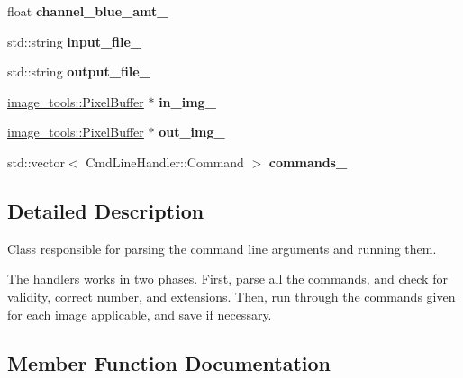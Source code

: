 \begin{DoxyCompactItemize}
\item 
float {\bfseries channel\+\_\+blue\+\_\+amt\+\_\+}\hypertarget{classCmdLineHandler_a722a00d746264abc7ed27ddbb9ba57ba}{}\label{classCmdLineHandler_a722a00d746264abc7ed27ddbb9ba57ba}

\item 
std\+::string {\bfseries input\+\_\+file\+\_\+}\hypertarget{classCmdLineHandler_a58722f1cd629f4f819594947b2d34009}{}\label{classCmdLineHandler_a58722f1cd629f4f819594947b2d34009}

\item 
std\+::string {\bfseries output\+\_\+file\+\_\+}\hypertarget{classCmdLineHandler_a0c8acf675fb60aaff100165f5ac3bacd}{}\label{classCmdLineHandler_a0c8acf675fb60aaff100165f5ac3bacd}

\item 
\hyperlink{classimage__tools_1_1PixelBuffer}{image\+\_\+tools\+::\+Pixel\+Buffer} $\ast$ {\bfseries in\+\_\+img\+\_\+}\hypertarget{classCmdLineHandler_a019ce0d524967719a10c201dc4c3dbb7}{}\label{classCmdLineHandler_a019ce0d524967719a10c201dc4c3dbb7}

\item 
\hyperlink{classimage__tools_1_1PixelBuffer}{image\+\_\+tools\+::\+Pixel\+Buffer} $\ast$ {\bfseries out\+\_\+img\+\_\+}\hypertarget{classCmdLineHandler_a45ea921229df1aed8f51d801c93d0225}{}\label{classCmdLineHandler_a45ea921229df1aed8f51d801c93d0225}

\item 
std\+::vector$<$ Cmd\+Line\+Handler\+::\+Command $>$ {\bfseries commands\+\_\+}\hypertarget{classCmdLineHandler_aa6cd35bdf3f91544801e64a0e5f202b1}{}\label{classCmdLineHandler_aa6cd35bdf3f91544801e64a0e5f202b1}

\end{DoxyCompactItemize}


\subsection{Detailed Description}
Class responsible for parsing the command line arguments and running them. 

The handlers works in two phases. First, parse all the commands, and check for validity, correct number, and extensions. Then, run through the commands given for each image applicable, and save if necessary. 

\subsection{Member Function Documentation}
